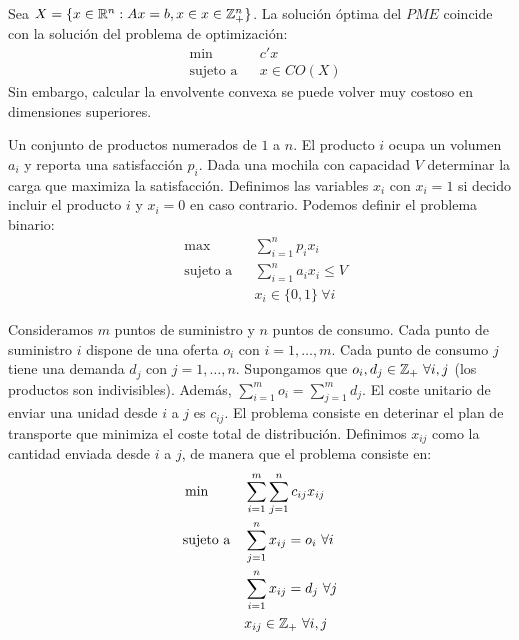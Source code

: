 \documentclass[PM.tex]{subfiles}
\begin{document}
\begin{obser}
Sea $X=\{x \in \mathbb{R}^n : Ax=b, x \in x \in \mathbb{Z}_+^n\}$. La solución óptima del $PME$ coincide con la solución del problema de optimización:
\[
\begin{aligned}
& \min
& & c'x \\
& \text{sujeto a}
& & x \in CO(X)\end{aligned}
\]
Sin embargo, calcular la envolvente convexa se puede volver muy costoso en dimensiones superiores.
\end{obser}
\newpage
\begin{example}
Un conjunto de productos numerados de $1$ a $n$. El producto $i$ ocupa un volumen $a_i$ y reporta una satisfacción $p_i$. Dada una mochila con capacidad $V$ determinar la carga que maximiza la satisfacción. Definimos las variables $x_i$ con $x_i = 1$ si decido incluir el producto $i$ y $x_i = 0$ en caso contrario. Podemos definir el problema binario:
\[
\begin{aligned}
& \max
& & \sum_{i=1}^n p_i x_i \\
& \text{sujeto a}
& & \sum_{i=1}^n a_i x_i ≤ V\\
& & & x_i \in \{0,1\}\ \forall i 
\end{aligned}
\]
\end{example}

\begin{example}
Consideramos $m$ puntos de suministro y $n$ puntos de consumo. Cada punto de suministro $i$ dispone de una oferta $o_i$ con $i = 1,\dots,m$. Cada punto de consumo $j$ tiene una demanda $d_j$ con $j = 1,\dots,n$. Supongamos que $o_i,d_j \in \mathbb{Z}_+\ \forall i,j$ (los productos son indivisibles). Además, $\sum_{i=1}^m o_i = \sum_{j=1}^m d_j$. El coste unitario de enviar una unidad desde $i$ a $j$ es $c_{ij}$. El problema consiste en deterinar el plan de transporte que minimiza el coste total de distribución. Definimos $x_{ij}$ como la cantidad enviada desde $i$ a $j$, de manera que el problema consiste en:
\[
\begin{aligned}
& \min
& & \sum_{i=1}^m \sum_{j=1}^n c_{ij}x_{ij} \\
& \text{sujeto a}
& & \sum_{j=1}^n x_{ij} = o_i \ \forall i\\
& & & \sum_{i=1}^n x_{ij} = d_j \ \forall j\\
& & & x_{ij} \in \mathbb{Z}_+ \ \forall i,j
\end{aligned}
\]
\end{example}
\end{document}
